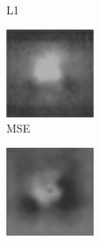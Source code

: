 \begin{figure}[H]
\begin{subfigure}[t]{0.13\textwidth}
    \caption{L1}
  \end{subfigure}
  \begin{subfigure}[t]{0.13\textwidth}
    \centering
    \includegraphics[width=\linewidth]{img/one-trial/prediction_4_mse.png}
    \caption{MSE}
  \end{subfigure}
  \begin{subfigure}[t]{0.13\textwidth}
    \centering
    \includegraphics[width=\linewidth]{img/one-trial/prediction_4_ssim.png}

\end{subfigure}
\end{figure}
